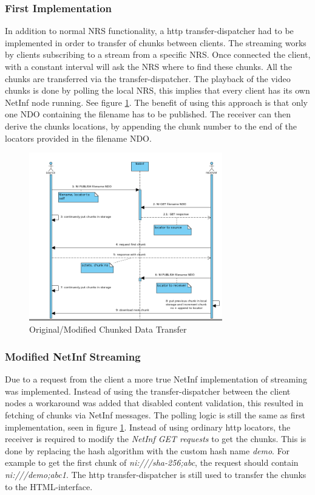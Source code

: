 \subsubsection{First Implementation}
In addition to normal NRS functionality, a http transfer-dispatcher had to be implemented in order to transfer of chunks between clients. The streaming works by clients subscribing to a stream from a specific NRS. Once connected the client, with a constant interval will ask the NRS where to find these chunks. All the chunks are transferred via the transfer-dispatcher.
The playback of the video chunks is done by polling the local NRS, this implies that every client has its own NetInf node running. See figure \ref{fig:stream-seqorgmod}. The benefit of using this approach is that only one NDO containing the filename has to be published. The receiver can then derive the chunks locations, by appending the chunk number to the end of the locators provided in the filename NDO.

\begin{figure}[h!]
	\centering
		\includegraphics[width=0.75\textwidth]{./img/sequence_diagram_streaming_orgmod.png}
    	\caption{Original/Modified Chunked Data Transfer}
	\label{fig:stream-seqorgmod}
\end{figure}

\subsubsection{Modified NetInf Streaming}
Due to a request from the client a more true NetInf implementation of streaming was implemented. Instead of using the transfer-dispatcher between the client nodes a workaround was added that disabled content validation, this resulted in fetching of chunks via NetInf messages. The polling logic is still the same as first implementation, seen in figure \ref{fig:stream-seqorgmod}. Instead of using ordinary http locators, the receiver is required to modify the \textit{NetInf GET requests} to get the chunks. This is done by replacing the hash algorithm with the custom hash name \textit{demo}. For example to get the first chunk of \textit{ni:///sha-256;abc}, the request should contain \textit{ni:///demo;abc1}. The http transfer-dispatcher is still used to transfer the chunks to the HTML-interface.

